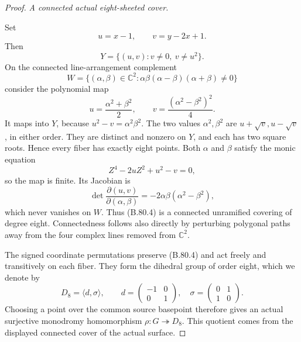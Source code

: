 \begin{proof}
\emph{A connected actual eight-sheeted cover.}\par
Set
\[
          u=x-1,\qquad v=y-2x+1.
\]
Then
\[
                Y=\{(u,v):v\ne0,\ v\ne u^2\}.
 \tag{B.80.3}
\]
On the connected line-arrangement complement
\[
 W=\{(\alpha,\beta)\in\mathbb C^2:
              \alpha\beta(\alpha-\beta)(\alpha+\beta)\ne0\}
\]
consider the polynomial map
\[
       u=\frac{\alpha^2+\beta^2}{2},\qquad
       v=\frac{(\alpha^2-\beta^2)^2}{4}.
 \tag{B.80.4}
\]
It maps into \(Y\), because
\(u^2-v=\alpha^2\beta^2\). The two values
\(\alpha^2,\beta^2\) are \(u+\sqrt v,u-\sqrt v\), in either
order. They are distinct and nonzero on \(Y\), and each has two
square roots. Hence every fiber has exactly eight points. Both
\(\alpha\) and \(\beta\) satisfy the monic equation
\[
              Z^4-2uZ^2+u^2-v=0,
\]
so the map is finite. Its Jacobian is
\[
 \det\frac{\partial(u,v)}{\partial(\alpha,\beta)}
       =-2\alpha\beta(\alpha^2-\beta^2),
 \tag{B.80.5}
\]
which never vanishes on \(W\). Thus (B.80.4) is a connected
unramified covering of degree eight. Connectedness follows also
directly by perturbing polygonal paths away from the four complex
lines removed from \(\mathbb C^2\).

The signed coordinate permutations preserve (B.80.4) and act freely
and transitively on each fiber. They form the dihedral group of
order eight, which we denote by
\[
 D_8=\langle d,\sigma\rangle,
 \qquad
 d=\begin{pmatrix}-1&0\\0&1\end{pmatrix},
 \quad
 \sigma=\begin{pmatrix}0&1\\1&0\end{pmatrix}.
 \tag{B.80.6}
\]
Choosing a point over the common source basepoint therefore gives
an actual surjective monodromy homomorphism
\(\rho:G\twoheadrightarrow D_8\). This quotient comes from the
displayed connected cover of the actual surface.


\end{proof}
